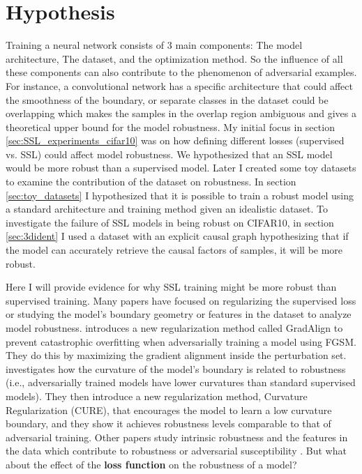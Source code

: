 \documentclass[../thesis.tex]{subfiles}
\begin{document}
\section{Hypothesis}
\label{sec:hypothesis}

Training a neural network consists of 3 main components: The model architecture, The dataset, and the optimization method. So the influence of all these components can also contribute to the phenomenon of adversarial examples. For instance, a convolutional network has a specific architecture that could affect the smoothness of the boundary, or separate classes in the dataset could be overlapping which makes the samples in the overlap region ambiguous and gives a theoretical upper bound for the model robustness. My initial focus in section \ref{sec:SSL_experiments_cifar10} was on how defining different losses (supervised vs. SSL) could affect model robustness. We hypothesized that an SSL model would be more robust than a supervised model. Later I created some toy datasets to examine the contribution of the dataset on robustness. In section \ref{sec:toy_datasets} I hypothesized that it is possible to train a robust model using a standard architecture and training method given an idealistic dataset. To investigate the failure of SSL models in being robust on CIFAR10, in section \ref{sec:3dident} I used a dataset with an explicit causal graph hypothesizing that if the model can accurately retrieve the causal factors of samples, it will be more robust.  

Here I will provide evidence for why SSL training might be more robust than supervised training. Many papers have focused on regularizing the supervised loss or studying the model's boundary geometry or features in the dataset to analyze model robustness. \cite{grad_align} introduces a new regularization method called GradAlign to prevent catastrophic overfitting when adversarially training a model using FGSM. They do this by maximizing the gradient alignment inside the perturbation set. \cite{cure} investigates how the curvature of the model's boundary is related to robustness (i.e., adversarially trained models have lower curvatures than standard supervised models). They then introduce a new regularization method, Curvature Regularization (CURE), that encourages the model to learn a low curvature boundary, and they show it achieves robustness levels comparable to that of adversarial training. Other papers study intrinsic robustness and the features in the data which contribute to robustness or adversarial susceptibility \cite{features_not_bugs_madry}. But what about the effect of the \textbf{loss function} on the robustness of a model? 
\end{document}
